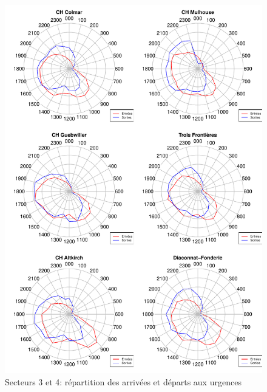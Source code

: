 \documentclass[12pt,english,french,twoside]{book}\usepackage[]{graphicx}\usepackage[]{color}
\makeatletter
\def\maxwidth{ %
  \ifdim\Gin@nat@width>\linewidth
    \linewidth
  \else
    \Gin@nat@width
  \fi
}
\newenvironment{knitrout}{}{} %
\makeatother
\begin{document}
\begin{figure}
\begin{center}
\begin{knitrout}
\color{fgcolor}
\includegraphics[width=\maxwidth]{figure/test26} 

\end{knitrout}

\end{center}
\caption{Secteurs 3 et 4: répartition des arrivées et départs aux urgences}
\label{passage:col}
\end{figure}
\end{document}
